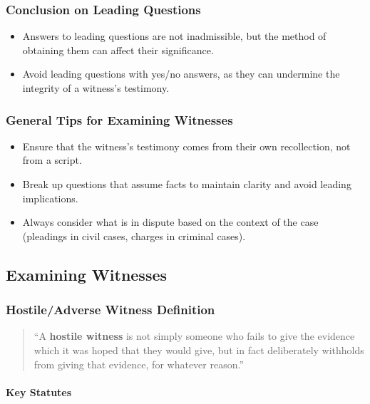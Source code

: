 \subsubsection{Conclusion on Leading
Questions}\label{conclusion-on-leading-questions}

\begin{itemize}
\tightlist
\item
  Answers to leading questions are not inadmissible, but the method of
  obtaining them can affect their significance.
\item
  Avoid leading questions with yes/no answers, as they can undermine the
  integrity of a witness's testimony.
\end{itemize}

\subsubsection{General Tips for Examining
Witnesses}\label{general-tips-for-examining-witnesses}

\begin{itemize}
\tightlist
\item
  Ensure that the witness's testimony comes from their own recollection,
  not from a script.
\item
  Break up questions that assume facts to maintain clarity and avoid
  leading implications.
\item
  Always consider what is in dispute based on the context of the case
  (pleadings in civil cases, charges in criminal cases).
\end{itemize}

\subsection{  Examining Witnesses}\label{examining-witnesses}

\subsubsection{Hostile/Adverse Witness
Definition}\label{hostileadverse-witness-definition}

\begin{quote}
``A \textbf{hostile witness} is not simply someone who fails to give the
evidence which it was hoped that they would give, but in fact
deliberately withholds from giving that evidence, for whatever reason.''
\end{quote}

\paragraph{Key Statutes}\label{key-statutes}

